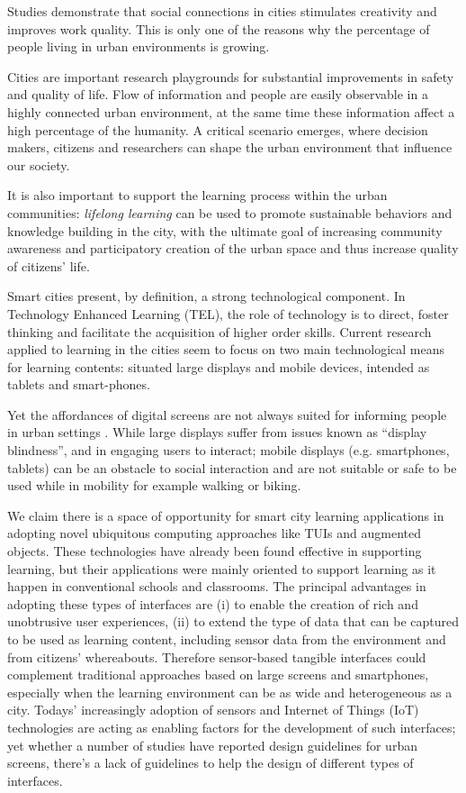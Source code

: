 Studies demonstrate that social connections in cities stimulates creativity and improves work quality\cite{florida_cities_2005}. This is only one of the reasons why the percentage of people living in urban environments is growing.

Cities are important research playgrounds for substantial improvements in safety and quality of life.
Flow of information and people are easily observable in a highly connected urban environment, at the same time these information affect a high percentage of the humanity. A critical scenario emerges, where decision makers, citizens and researchers can shape the urban environment that influence our society.

It is also important to support the learning process within the urban communities: \textit{lifelong learning} can be used to promote sustainable behaviors and knowledge building in the city, with the ultimate goal of increasing community awareness and participatory creation of the urban space and thus increase quality of citizens' life.

Smart cities present, by definition, a strong technological component.
In Technology Enhanced Learning (TEL), the role of technology is to direct, foster thinking and facilitate the acquisition of higher order skills\cite{goodyear_technologyenhanced_2010}.
Current research applied to learning in the cities seem to focus on two main technological means for learning contents: situated large displays and mobile devices, intended as tablets and smart-phones\cite{luff_mobility_1998}.

Yet the affordances of digital screens are not always suited for informing people in urban settings \cite{koeman_what_2014}. While large displays suffer from issues known as ``display blindness'', and in engaging users to interact; mobile displays (e.g. smartphones, tablets) can be an obstacle to social interaction and are not suitable or safe to be used while in mobility for example walking or biking.

We claim there is a space of opportunity for smart city learning applications in adopting novel ubiquitous computing approaches like TUIs and augmented objects. These technologies have already been found effective in supporting learning\cite{stanton_classroom_2001}, but their applications were mainly oriented to support learning as it happen in conventional schools and classrooms. The principal advantages in adopting these types of interfaces are (i) to enable the creation of rich and unobtrusive user experiences, (ii) to extend the type of data that can be captured to be used as learning content, including sensor data from the environment and from citizens' whereabouts. Therefore sensor-based tangible interfaces could complement traditional approaches based on large screens and smartphones, especially when the learning environment can be as wide and heterogeneous as a city. Todays' increasingly adoption of sensors and Internet of Things (IoT) technologies are acting as enabling factors for the development of such interfaces; yet whether a number of studies have reported design guidelines for urban screens, there's a lack of guidelines to help the design of different types of interfaces.

